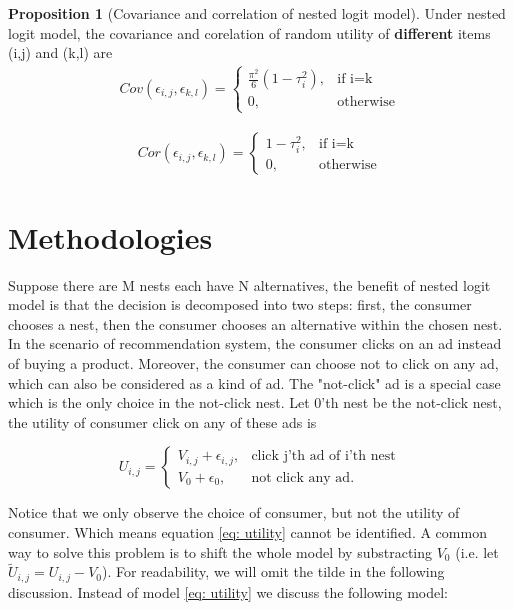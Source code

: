 \documentclass[12pt]{article}
\theoremstyle{definition}
\newtheorem{prop}[theorem]{Proposition}
\begin{document}
\begin{sloppypar}
\begin{prop}[Covariance and correlation of nested logit model]\label{prop:3}
    Under nested logit model, the covariance and corelation of random utility of \textbf{different} items (i,j) and (k,l) are
    \begin{align*}
        Cov(\epsilon_{i,j}, \epsilon_{k,l}) = 
        \begin{cases}
            \frac{\pi^2}{6}(1-\tau_i^2), & \text{if i=k} \\
            0, & \text{otherwise}
        \end{cases}
    \end{align*}

    \begin{align*}
        Cor(\epsilon_{i,j}, \epsilon_{k,l}) =
        \begin{cases}
            1-\tau_i^2, & \text{if i=k} \\
            0, & \text{otherwise}
        \end{cases}
    \end{align*}
\end{prop}

\section{Methodologies}
Suppose there are M nests each have N alternatives, the benefit of nested logit model is that the decision is decomposed into two steps: first, the consumer chooses a nest, then the consumer chooses an alternative within the chosen nest. In the scenario of recommendation system, the consumer clicks on an ad instead of buying a product. Moreover, the consumer can choose not to click on any ad, which can also be considered as a kind of ad. The "not-click" ad is a special case which is the only choice in the not-click nest. Let 0'th nest be the not-click nest, the utility of consumer click on any of these ads is 

\begin{equation}\label{eq: utility}
    U_{i,j} = 
    \begin{cases}
        V_{i,j} + \epsilon_{i,j}, &\text{click j'th ad of i'th nest} \\
        V_0 + \epsilon_0, &\text{not click any ad}.     
    \end{cases}
\end{equation}

\indent Notice that we only observe the choice of consumer, but not the utility of consumer. Which means equation \ref{eq: utility} cannot be identified. A common way to solve this problem is to shift the whole model by substracting $V_0$ (i.e. let $\tilde{U}_{i,j} = U_{i,j} - V_0$).
For readability, we will omit the tilde in the following discussion. Instead of model \ref{eq: utility} we discuss the following model:


\end{sloppypar}
\end{document}
